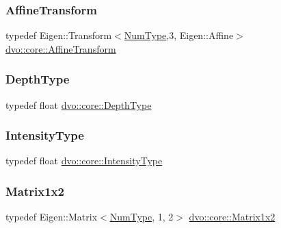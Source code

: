 \subsubsection{\texorpdfstring{Affine\+Transform}{AffineTransform}}
{\footnotesize\ttfamily typedef Eigen\+::\+Transform$<$\mbox{\hyperlink{namespacedvo_1_1core_ab9c199d221775a923e2549ad7e15c323}{Num\+Type}},3, Eigen\+::\+Affine$>$ \mbox{\hyperlink{namespacedvo_1_1core_af89a8f837f3ae51ed196b7988e59e53d}{dvo\+::core\+::\+Affine\+Transform}}}

\mbox{\label{namespacedvo_1_1core_a565534fff2ff821328d2df63f7bf1260}} 
\subsubsection{\texorpdfstring{Depth\+Type}{DepthType}}
{\footnotesize\ttfamily typedef float \mbox{\hyperlink{namespacedvo_1_1core_a565534fff2ff821328d2df63f7bf1260}{dvo\+::core\+::\+Depth\+Type}}}

\mbox{\label{namespacedvo_1_1core_a59740d7c1f271a6ec8cb2b5c42e7a3f2}} 
\subsubsection{\texorpdfstring{Intensity\+Type}{IntensityType}}
{\footnotesize\ttfamily typedef float \mbox{\hyperlink{namespacedvo_1_1core_a59740d7c1f271a6ec8cb2b5c42e7a3f2}{dvo\+::core\+::\+Intensity\+Type}}}

\mbox{\label{namespacedvo_1_1core_a1b2eef131d3b6ff8d3733810a89c9b98}} 
\subsubsection{\texorpdfstring{Matrix1x2}{Matrix1x2}}
{\footnotesize\ttfamily typedef Eigen\+::\+Matrix$<$\mbox{\hyperlink{namespacedvo_1_1core_ab9c199d221775a923e2549ad7e15c323}{Num\+Type}}, 1, 2$>$ \mbox{\hyperlink{namespacedvo_1_1core_a1b2eef131d3b6ff8d3733810a89c9b98}{dvo\+::core\+::\+Matrix1x2}}}

